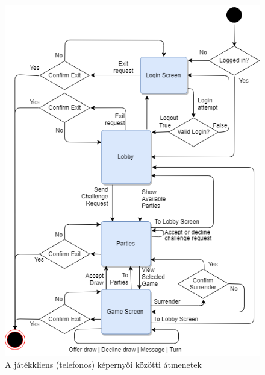 \documentclass[twoside, a4paper, 12pt]{article}
\begin{document}
\begin{figure}[htbp]
	\centering
	\includegraphics[width=\textwidth]{img/ClientScreenTransitions.png}
	\caption{A játékkliens (telefonos) képernyői közötti átmenetek}
	\label{fig:ClientScreenTransitions}
\end{figure}
\end{document}
